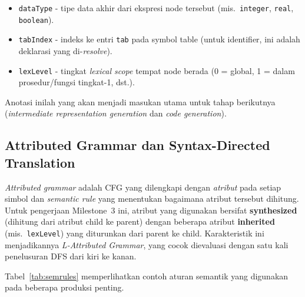 \documentclass[11pt,a4paper]{article}
\begin{document}
\begin{itemize}
    \item \texttt{dataType} - tipe data akhir dari ekspresi node tersebut
          (mis.\ \texttt{integer}, \texttt{real}, \texttt{boolean}).
    \item \texttt{tabIndex} - indeks ke entri \texttt{tab} pada symbol table
          (untuk identifier, ini adalah deklarasi yang di-\textit{resolve}).
    \item \texttt{lexLevel} - tingkat \textit{lexical scope} tempat node berada
          (0 = global, 1 = dalam prosedur/fungsi tingkat-1, dst.).
\end{itemize}

Anotasi inilah yang akan menjadi masukan utama untuk tahap berikutnya
(\textit{intermediate representation generation} dan \textit{code generation}).

\subsection{Attributed Grammar dan Syntax-Directed Translation}

\textit{Attributed grammar} adalah CFG yang dilengkapi dengan \textit{atribut}
pada setiap simbol dan \textit{semantic rule} yang menentukan bagaimana atribut
tersebut dihitung. Untuk pengerjaan Milestone~3 ini, atribut yang digunakan
bersifat \textbf{synthesized} (dihitung dari atribut child ke parent) dengan
beberapa atribut \textbf{inherited} (mis.\ \texttt{lexLevel}) yang diturunkan
dari parent ke child. Karakteristik ini menjadikannya \textit{L-Attributed
Grammar}, yang cocok dievaluasi dengan satu kali penelusuran DFS dari kiri ke
kanan.

Tabel~\ref{tab:semrules} memperlihatkan contoh aturan semantik yang digunakan
pada beberapa produksi penting.
\end{document}
